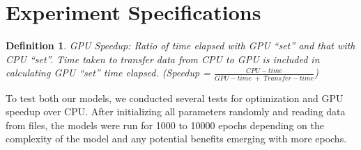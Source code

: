 \documentclass[12pt]{article}
\newtheorem{mydef}{Definition}
\begin{document}
    \section{Experiment Specifications} \label{sec:Experiment Specifications}
    \begin{mydef} \label{def:GPU Speedup}
        GPU Speedup: Ratio of time elapsed with GPU ``set'' and that with CPU ``set''. Time taken to transfer data from CPU to GPU is included in calculating GPU ``set'' time elapsed. (Speedup = $\frac{CPU-time}{GPU-time\; +\; Transfer-time}$)
    \end{mydef}
    To test both our models, we conducted several tests for optimization and GPU speedup over CPU. After initializing all parameters randomly and reading data from files, the models were run for 1000 to 10000 epochs depending on the complexity of the model and any potential benefits emerging with more epochs.
    
\end{document}
